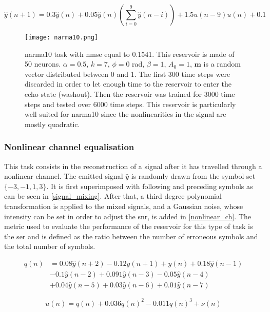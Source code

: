 \begin{equation}
	\hat{y}(n+1) = 0.3\hat{y}(n)+0.05\hat{y}(n)\left(\sum_{i=0}^9 \hat{y}(n-i) \right)+1.5u(n-9)u(n)+0.1
\end{equation}

\begin{figure}[h]
	\centering
	\texttt{[image: narma10.png]}
	\caption{\gls{narma}10 task with \gls{nmse} equal to 0.1541. This reservoir is made of 50 neurons. $\alpha=0.5$, $k=7$, $\phi=0$ rad, $\beta=1$, $A_0=1$, $\mathbf{m}$ is a random vector distributed between 0 and 1. The first 300 time steps were discarded in order to let enough time to the reservoir to enter the echo state (washout). Then the reservoir was trained for 3000 time steps and tested over 6000 time steps. This reservoir is particularly well suited for  \gls{narma}10 since the nonlinearities in the signal are mostly quadratic.}
	\label{narma10}
\end{figure}


\subsubsection{Nonlinear channel equalisation}

This task consists in the reconstruction of a signal after it has travelled through a nonlinear channel. The emitted signal $\hat{y}$ is randomly drawn from the symbol set $\{-3,-1,1,3\}$. It is first superimposed with following and preceding symbols as can be seen in \eqref{signal_mixing}. After that, a third degree polynomial transformation is applied to the mixed signals, and a Gaussian noise, whose intensity can be set in order to adjust the \gls{snr}, is added in \eqref{nonlinear_ch}. The metric used to evaluate the performance of the reservoir for this type of task is the \gls{ser} and is defined as the ratio between the number of erroneous symbols and the total number of symbols.

\begin{align}
	q(n) &= 0.08\hat{y}(n+2)-0.12\hat{y}(n+1)+\hat{y}(n)+0.18\hat{y}(n-1) \nonumber\\
	&-0.1\hat{y}(n-2)+0.091\hat{y}(n-3)-0.05\hat{y}(n-4) \nonumber\\
	&+0.04\hat{y}(n-5)+0.03\hat{y}(n-6)+0.01\hat{y}(n-7) \label{signal_mixing}
\end{align}

\begin{equation}
	u(n)=q(n)+0.036q(n)^2-0.011q(n)^3+\nu(n)
	\label{nonlinear_ch}
\end{equation}

